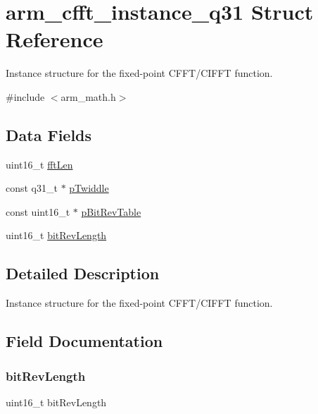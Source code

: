 \hypertarget{structarm__cfft__instance__q31}{}\section{arm\+\_\+cfft\+\_\+instance\+\_\+q31 Struct Reference}
\label{structarm__cfft__instance__q31}


Instance structure for the fixed-\/point C\+F\+F\+T/\+C\+I\+F\+FT function.  




{\ttfamily \#include $<$arm\+\_\+math.\+h$>$}

\subsection*{Data Fields}
\begin{DoxyCompactItemize}
\item 
uint16\+\_\+t \hyperlink{structarm__cfft__instance__q31_ab8db3bbe7c61e6bb8ca2a55e3446e11a}{fft\+Len}
\item 
const q31\+\_\+t $\ast$ \hyperlink{structarm__cfft__instance__q31_a9760c603af5d85652496dbffd63a8a2e}{p\+Twiddle}
\item 
const uint16\+\_\+t $\ast$ \hyperlink{structarm__cfft__instance__q31_a3b229432d381b0a511a9cdbe3aa74e78}{p\+Bit\+Rev\+Table}
\item 
uint16\+\_\+t \hyperlink{structarm__cfft__instance__q31_a65e1b3e327b8fab9404287ed8f347cc8}{bit\+Rev\+Length}
\end{DoxyCompactItemize}


\subsection{Detailed Description}
Instance structure for the fixed-\/point C\+F\+F\+T/\+C\+I\+F\+FT function. 

\subsection{Field Documentation}
\mbox{\label{structarm__cfft__instance__q31_a65e1b3e327b8fab9404287ed8f347cc8}} 
\subsubsection{\texorpdfstring{bit\+Rev\+Length}{bitRevLength}}
{\footnotesize\ttfamily uint16\+\_\+t bit\+Rev\+Length}


